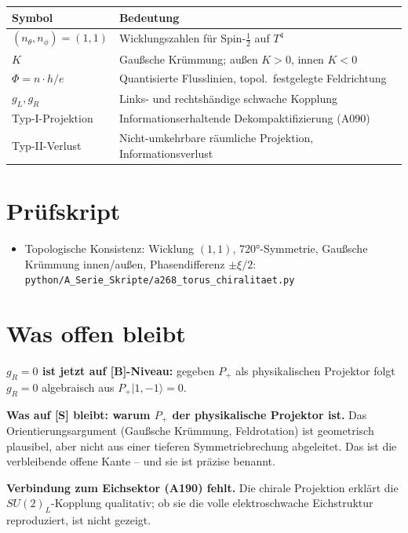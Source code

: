 \begin{center}
\renewcommand{\arraystretch}{1.3}
{\small\begin{tabular}{lp{9cm}}
\toprule
Symbol & Bedeutung \\
\midrule
$(n_\theta,n_\phi)=(1,1)$ & Wicklungszahlen für Spin-$\tfrac12$ auf $T^4$ \\
$K$ & Gaußsche Krümmung; außen $K>0$, innen $K<0$ \\
$\Phi=n\cdot h/e$ & Quantisierte Flusslinien, topol.\ festgelegte Feldrichtung \\
$g_L, g_R$ & Links- und rechtshändige schwache Kopplung \\
Typ-I-Projektion & Informationserhaltende Dekompaktifizierung (A090) \\
Typ-II-Verlust & Nicht-umkehrbare räumliche Projektion, Informationsverlust \\
\bottomrule
\end{tabular}}
\renewcommand{\arraystretch}{1.0}
\end{center}

\section{Prüfskript}

\begin{itemize}[leftmargin=2em,itemsep=2pt,topsep=2pt]
  \item Topologische Konsistenz: Wicklung $(1,1)$, 720°-Symmetrie,
    Gaußsche Krümmung innen/außen, Phasendifferenz $\pm\xi/2$:
    \texttt{python/A\_Serie\_Skripte/a268\_torus\_chiralitaet.py}
\end{itemize}

\section{Was offen bleibt}

\textbf{$g_R=0$ ist jetzt auf [B]-Niveau:} gegeben $P_+$ als physikalischen
Projektor folgt $g_R=0$ algebraisch aus $P_+|1,{-}1\rangle=0$.

\textbf{Was auf [S] bleibt: warum $P_+$ der physikalische Projektor ist.}
Das Orientierungsargument (Gaußsche Krümmung, Feldrotation) ist geometrisch
plausibel, aber nicht aus einer tieferen Symmetriebrechung abgeleitet.
Das ist die verbleibende offene Kante -- und sie ist präzise benannt.

\textbf{Verbindung zum Eichsektor (A190) fehlt.} Die chirale Projektion
erklärt die $SU(2)_L$-Kopplung qualitativ; ob sie die volle
elektroschwache Eichstruktur reproduziert, ist nicht gezeigt.

